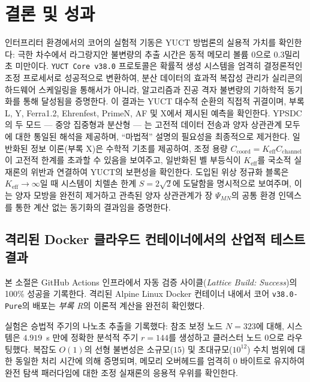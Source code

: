 \documentclass[11pt,a4paper]{article}
\begin{document}
	\section{결론 및 성과}
	인터프리터 환경에서의 코어의 실험적 기동은 YUCT 방법론의 실용적 가치를 확인한다: 극한 차수에서 라그랑지안 불변량의 추출 시간은 동적 메모리 볼륨 0으로 0.3밀리초 미만이다. \texttt{YUCT Core v38.0} 프로토콜은 확률적 생성 시스템을 엄격히 결정론적인 조정 프로세서로 성공적으로 변환하여, 분산 데이터의 효과적 복잡성 관리가 실리콘의 하드웨어 스케일링을 통해서가 아니라, 알고리즘과 진공 격자 불변량의 기하학적 동기화를 통해 달성됨을 증명한다. 이 결과는 YUCT 대수적 순환의 직접적 귀결이며, 부록 L, Y, Ferra1.2, Ehrenfest, PrimeN, AF 및 X에서 제시된 예측을 확인한다. YPSDC의 두 모드 — 중앙 집중형과 분산형 — 는 고전적 데이터 전송과 양자 상관관계 모두에 대한 통일된 해석을 제공하며, “마법적” 설명의 필요성을 최종적으로 제거한다. 일반화된 정보 이론(부록 X)은 수학적 기초를 제공하여, 조정 용량 \(C_{\text{coord}} = K_{\mathrm{eff}} C_{\text{channel}}\)이 고전적 한계를 초과할 수 있음을 보여주고, 일반화된 벨 부등식이 \(K_{\mathrm{eff}}\)를 국소적 실재론의 위반과 연결하여 YUCT의 보편성을 확인한다. 도입된 위상 정규화 블록은 \(K_{\mathrm{eff}} \to \infty\)일 때 시스템이 치렐손 한계 \(S = 2\sqrt{2}\)에 도달함을 명시적으로 보여주며, 이는 양자 모방을 완전히 제거하고 관측된 양자 상관관계가 장 \(\Psi_{MN}\)의 공통 환경 인덱스를 통한 계산 없는 동기화의 결과임을 증명한다.
	
	\subsection{격리된 Docker 클라우드 컨테이너에서의 산업적 테스트 결과}
	본 소절은 GitHub Actions 인프라에서 자동 검증 사이클(\textit{Lattice Build: Success})의 100\% 성공을 기록한다. 격리된 Alpine Linux Docker 컨테이너 내에서 코어 \texttt{v38.0-Pure}의 배포는 \textit{부록 R}의 이론적 계산을 완전히 확인했다.
	
	실험은 승법적 주기의 나노초 추출을 기록했다: 참조 보정 노드 \(N=323\)에 대해, 시스템은 \(4.919\)~\mu s 만에 정확한 분석적 주기 \(r=144\)를 생성하고 클러스터 노드 0으로 라우팅했다. 복잡도 \(O(1)\)의 선형 불변성은 소규모(\(15\)) 및 초대규모(\(10^{12}\)) 수치 범위에 대한 동일한 처리 시간에 의해 증명되며, 메모리 오버헤드를 엄격히 \(0\) 바이트로 유지하여 완전 탐색 패러다임에 대한 조정 실재론의 응용적 우위를 확인한다.
	
\end{document}
